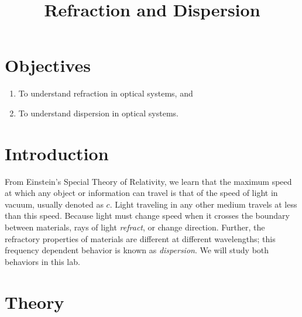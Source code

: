\documentclass[12pt]{article}
\title{Refraction and Dispersion}
\author{}
\date{}
\begin{document}
\maketitle

\section{Objectives}
\label{sec:objectives}

\begin{enumerate}
\item To understand refraction in optical systems, and
\item To understand dispersion in optical systems.
\end{enumerate}

\section{Introduction}
\label{sec:introduction}

From Einstein's Special Theory of Relativity, we learn that the
maximum speed at which any object or information can travel is that of
the speed of light in vacuum, usually denoted as $c$.  Light traveling
in any other medium travels at less than this speed.  Because light
must change speed when it crosses the boundary between materials, rays
of light \textit{refract}, or change direction.  Further, the
refractory properties of materials are different at different
wavelengths; this frequency dependent behavior is known as
\textit{dispersion}.  We will study both behaviors in this lab.

\section{Theory}
\label{sec:theory}
\end{document}
